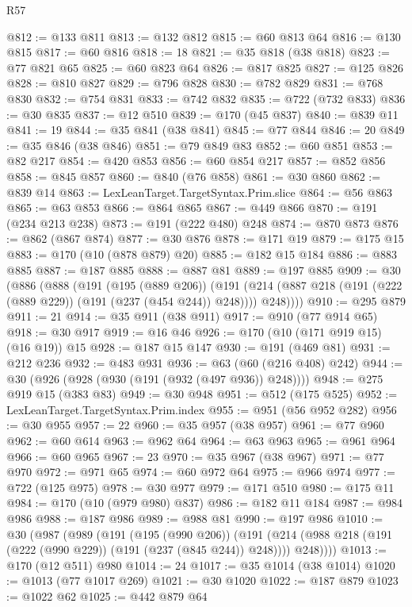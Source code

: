 \begin{lexlean}{R57}
\begin{coremodule}
@812 := @133 @811
@813 := @132 @812
@815 := @60 @813 @64
@816 := @130 @815
@817 := @60 @816
@818 := 18
@821 := @35 @818 (@38 @818)
@823 := @77 @821 @65
@825 := @60 @823 @64
@826 := @817 @825
@827 := @125 @826
@828 := @810 @827
@829 := @796 @828
@830 := @782 @829
@831 := @768 @830
@832 := @754 @831
@833 := @742 @832
@835 := @722 (@732 @833)
@836 := @30 @835
@837 := @12 @510
@839 := @170 (@45 @837)
@840 := @839 @11
@841 := 19
@844 := @35 @841 (@38 @841)
@845 := @77 @844
@846 := 20
@849 := @35 @846 (@38 @846)
@851 := @79 @849 @83
@852 := @60 @851
@853 := @82 @217
@854 := @420 @853
@856 := @60 @854 @217
@857 := @852 @856
@858 := @845 @857
@860 := @840 (@76 @858)
@861 := @30 @860
@862 := @839 @14
@863 := LexLeanTarget.TargetSyntax.Prim.slice
@864 := @56 @863
@865 := @63 @853
@866 := @864 @865
@867 := @449 @866
@870 := @191 (@234 @213 @238)
@873 := @191 (@222 @480) @248
@874 := @870 @873
@876 := @862 (@867 @874)
@877 := @30 @876
@878 := @171 @19
@879 := @175 @15
@883 := @170 (@10 (@878 @879) @20)
@885 := @182 @15 @184
@886 := @883 @885
@887 := @187 @885
@888 := @887 @81
@889 := @197 @885
@909 := @30
    (@886
      (@888
        (@191
          (@195 (@889 @206))
          (@191 (@214 (@887 @218 (@191 (@222 (@889 @229)) (@191 (@237 (@454 @244)) @248)))) @248))))
@910 := @295 @879
@911 := 21
@914 := @35 @911 (@38 @911)
@917 := @910 (@77 @914 @65)
@918 := @30 @917
@919 := @16 @46
@926 := @170 (@10 (@171 @919 @15) (@16 @19)) @15
@928 := @187 @15 @147
@930 := @191 (@469 @81)
@931 := @212 @236
@932 := @483 @931
@936 := @63 (@60 (@216 @408) @242)
@944 := @30 (@926 (@928 (@930 (@191 (@932 (@497 @936)) @248))))
@948 := @275 @919 @15 (@383 @83)
@949 := @30 @948
@951 := @512 (@175 @525)
@952 := LexLeanTarget.TargetSyntax.Prim.index
@955 := @951 (@56 @952 @282)
@956 := @30 @955
@957 := 22
@960 := @35 @957 (@38 @957)
@961 := @77 @960
@962 := @60 @614
@963 := @962 @64
@964 := @63 @963
@965 := @961 @964
@966 := @60 @965
@967 := 23
@970 := @35 @967 (@38 @967)
@971 := @77 @970
@972 := @971 @65
@974 := @60 @972 @64
@975 := @966 @974
@977 := @722 (@125 @975)
@978 := @30 @977
@979 := @171 @510
@980 := @175 @11
@984 := @170 (@10 (@979 @980) @837)
@986 := @182 @11 @184
@987 := @984 @986
@988 := @187 @986
@989 := @988 @81
@990 := @197 @986
@1010 := @30
    (@987
      (@989
        (@191
          (@195 (@990 @206))
          (@191 (@214 (@988 @218 (@191 (@222 (@990 @229)) (@191 (@237 (@845 @244)) @248)))) @248))))
@1013 := @170 (@12 @511) @980
@1014 := 24
@1017 := @35 @1014 (@38 @1014)
@1020 := @1013 (@77 @1017 @269)
@1021 := @30 @1020
@1022 := @187 @879
@1023 := @1022 @62
@1025 := @442 @879 @64

\end{coremodule}
\end{lexlean}
